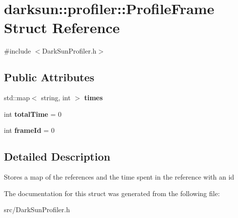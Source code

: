 \hypertarget{structdarksun_1_1profiler_1_1_profile_frame}{}\section{darksun\+::profiler\+::Profile\+Frame Struct Reference}
\label{structdarksun_1_1profiler_1_1_profile_frame}


{\ttfamily \#include $<$Dark\+Sun\+Profiler.\+h$>$}

\subsection*{Public Attributes}
\begin{DoxyCompactItemize}
\item 
\mbox{\label{structdarksun_1_1profiler_1_1_profile_frame_a56d7a69f2380d521ee4b746564dcc43a}} 
std\+::map$<$ string, int $>$ {\bfseries times}
\item 
\mbox{\label{structdarksun_1_1profiler_1_1_profile_frame_ac3b56e5b7e9e6175576db6af2aa61f32}} 
int {\bfseries total\+Time} = 0
\item 
\mbox{\label{structdarksun_1_1profiler_1_1_profile_frame_a3441cf6c2bd6d53bc8ee61211d223634}} 
int {\bfseries frame\+Id} = 0
\end{DoxyCompactItemize}


\subsection{Detailed Description}
Stores a map of the references and the time spent in the reference with an id 

The documentation for this struct was generated from the following file\+:\begin{DoxyCompactItemize}
\item 
src/Dark\+Sun\+Profiler.\+h\end{DoxyCompactItemize}
